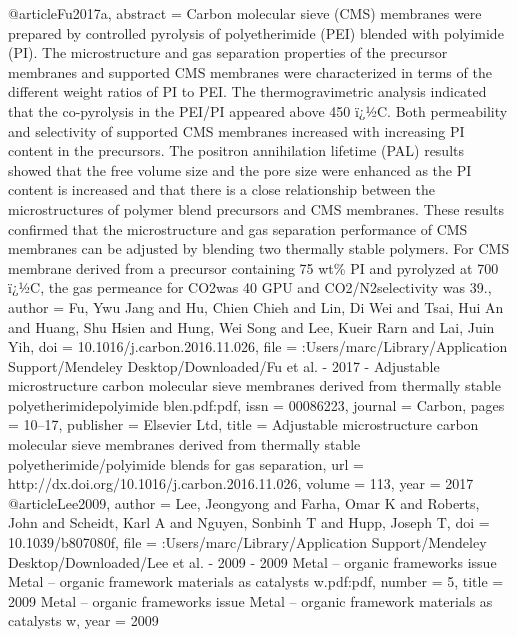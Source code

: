 @article{Fu2017a,
abstract = {Carbon molecular sieve (CMS) membranes were prepared by controlled pyrolysis of polyetherimide (PEI) blended with polyimide (PI). The microstructure and gas separation properties of the precursor membranes and supported CMS membranes were characterized in terms of the different weight ratios of PI to PEI. The thermogravimetric analysis indicated that the co-pyrolysis in the PEI/PI appeared above 450 {\"{i}}¿½C. Both permeability and selectivity of supported CMS membranes increased with increasing PI content in the precursors. The positron annihilation lifetime (PAL) results showed that the free volume size and the pore size were enhanced as the PI content is increased and that there is a close relationship between the microstructures of polymer blend precursors and CMS membranes. These results confirmed that the microstructure and gas separation performance of CMS membranes can be adjusted by blending two thermally stable polymers. For CMS membrane derived from a precursor containing 75 wt{\%} PI and pyrolyzed at 700 {\"{i}}¿½C, the gas permeance for CO2was 40 GPU and CO2/N2selectivity was 39.},
author = {Fu, Ywu Jang and Hu, Chien Chieh and Lin, Di Wei and Tsai, Hui An and Huang, Shu Hsien and Hung, Wei Song and Lee, Kueir Rarn and Lai, Juin Yih},
doi = {10.1016/j.carbon.2016.11.026},
file = {:Users/marc/Library/Application Support/Mendeley Desktop/Downloaded/Fu et al. - 2017 - Adjustable microstructure carbon molecular sieve membranes derived from thermally stable polyetherimidepolyimide blen.pdf:pdf},
issn = {00086223},
journal = {Carbon},
pages = {10--17},
publisher = {Elsevier Ltd},
title = {{Adjustable microstructure carbon molecular sieve membranes derived from thermally stable polyetherimide/polyimide blends for gas separation}},
url = {http://dx.doi.org/10.1016/j.carbon.2016.11.026},
volume = {113},
year = {2017}
}
@article{Lee2009,
author = {Lee, Jeongyong and Farha, Omar K and Roberts, John and Scheidt, Karl A and Nguyen, Sonbinh T and Hupp, Joseph T},
doi = {10.1039/b807080f},
file = {:Users/marc/Library/Application Support/Mendeley Desktop/Downloaded/Lee et al. - 2009 - 2009 Metal – organic frameworks issue Metal – organic framework materials as catalysts w.pdf:pdf},
number = {5},
title = {{2009 Metal – organic frameworks issue Metal – organic framework materials as catalysts w}},
year = {2009}
}

